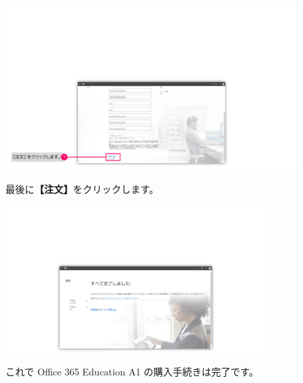 \begin{figure}[h]
    \begin{minipage}{0.6\textwidth}
        \vspace{-2cm}\hspace{-0.8cm}
        \includegraphics[width=11.5cm]{figures/O365A1_buy04.png}
    \end{minipage}
    \begin{minipage}{0.4\textwidth}
        最後に\textbf{【注文】}をクリックします。
    \end{minipage}
\end{figure}

\begin{figure}[h]
    \begin{minipage}{0.6\textwidth}
        \vspace{-2cm}
        \includegraphics[width=10cm]{figures/O365A1_buy05.png}
    \end{minipage}
    \begin{minipage}{0.4\textwidth}
        これで Office 365 Education A1 の購入手続きは完了です。
    \end{minipage}
    \vspace{13cm}
\end{figure}

